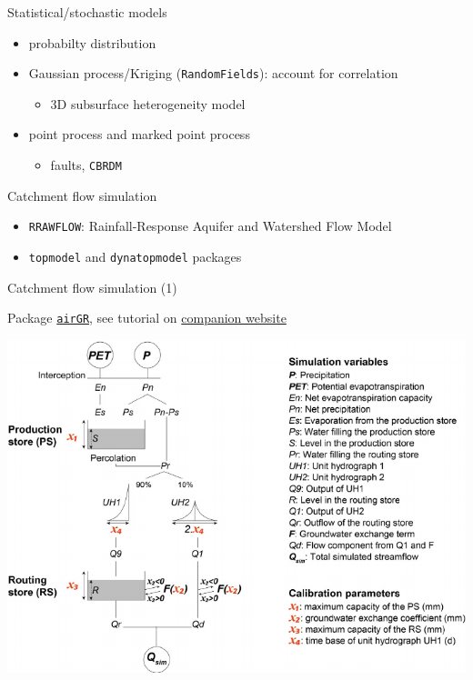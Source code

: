 \documentclass[8pt,ignorenonframetext,]{beamer}
\providecommand{\tightlist}{%
  \setlength{\itemsep}{0pt}\setlength{\parskip}{0pt}}
\begin{document}
\begin{frame}[fragile]{Statistical/stochastic models}

\begin{itemize}
\tightlist
\item
  probabilty distribution
\item
  Gaussian process/Kriging (\texttt{RandomFields}): account for
  correlation

  \begin{itemize}
  \tightlist
  \item
    3D subsurface heterogeneity model
  \end{itemize}
\item
  point process and marked point process

  \begin{itemize}
  \tightlist
  \item
    faults, \texttt{CBRDM}
  \end{itemize}
\end{itemize}

\end{frame}

\begin{frame}[fragile]{Catchment flow simulation}

\begin{itemize}
\tightlist
\item
  \texttt{RRAWFLOW}: Rainfall-Response Aquifer and Watershed Flow Model
\item
  \texttt{topmodel} and \texttt{dynatopmodel} packages
\end{itemize}

\end{frame}

\begin{frame}[fragile]{Catchment flow simulation (1)}

Package
\href{https://cran.r-project.org/web/packages/airGR/index.html}{\texttt{airGR}},
see tutorial on
\href{https://odelaigue.github.io/airGR/index.html}{companion website}

\includegraphics{imgPres/airGR_GR4J.png}

\end{frame}
\end{document}

